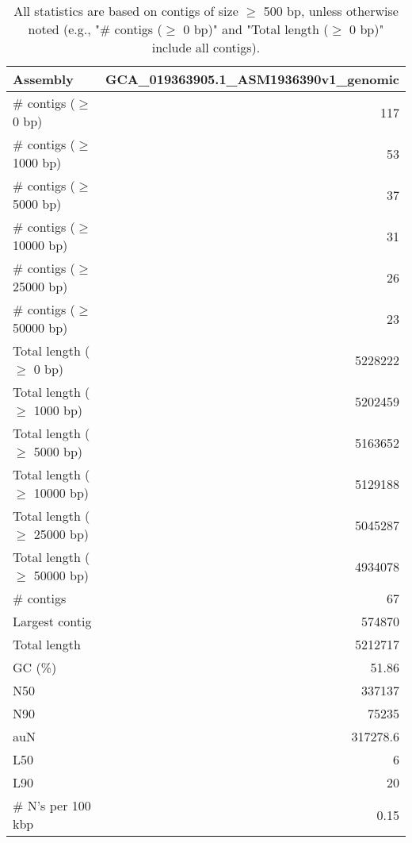 \documentclass[12pt,a4paper]{article}
\begin{document}
\begin{table}[ht]
\begin{center}
\caption{All statistics are based on contigs of size $\geq$ 500 bp, unless otherwise noted (e.g., "\# contigs ($\geq$ 0 bp)" and "Total length ($\geq$ 0 bp)" include all contigs).}
\begin{tabular}{|l*{1}{|r}|}
\hline
Assembly & GCA\_019363905.1\_ASM1936390v1\_genomic \\ \hline
\# contigs ($\geq$ 0 bp) & 117 \\ \hline
\# contigs ($\geq$ 1000 bp) & 53 \\ \hline
\# contigs ($\geq$ 5000 bp) & 37 \\ \hline
\# contigs ($\geq$ 10000 bp) & 31 \\ \hline
\# contigs ($\geq$ 25000 bp) & 26 \\ \hline
\# contigs ($\geq$ 50000 bp) & 23 \\ \hline
Total length ($\geq$ 0 bp) & 5228222 \\ \hline
Total length ($\geq$ 1000 bp) & 5202459 \\ \hline
Total length ($\geq$ 5000 bp) & 5163652 \\ \hline
Total length ($\geq$ 10000 bp) & 5129188 \\ \hline
Total length ($\geq$ 25000 bp) & 5045287 \\ \hline
Total length ($\geq$ 50000 bp) & 4934078 \\ \hline
\# contigs & 67 \\ \hline
Largest contig & 574870 \\ \hline
Total length & 5212717 \\ \hline
GC (\%) & 51.86 \\ \hline
N50 & 337137 \\ \hline
N90 & 75235 \\ \hline
auN & 317278.6 \\ \hline
L50 & 6 \\ \hline
L90 & 20 \\ \hline
\# N's per 100 kbp & 0.15 \\ \hline
\end{tabular}
\end{center}
\end{table}
\end{document}

